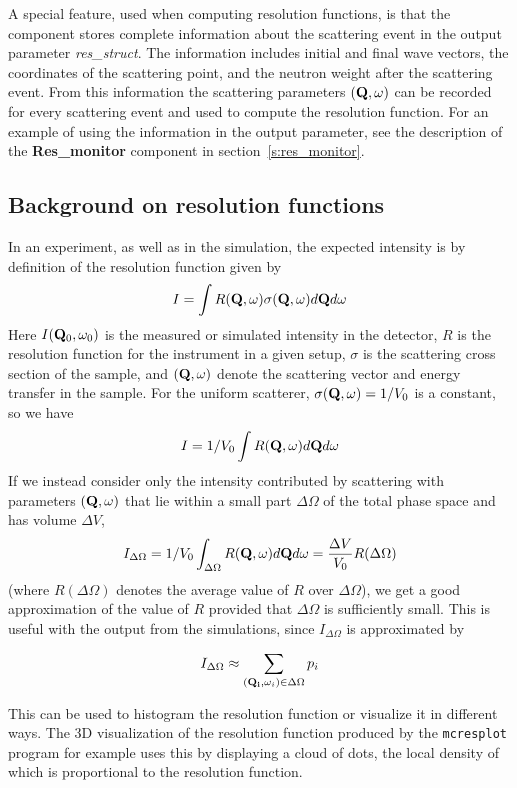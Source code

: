 A special feature, used when computing resolution functions, is that the
component stores complete information about the scattering event in the
output parameter \textit{res\_struct}. The information includes initial
and final wave vectors, the coordinates of the scattering point, and the
neutron weight after the scattering event. From this information the
scattering parameters $({\bf Q}, \omega)$ can be recorded
for every scattering event and used to compute the resolution function.
For an example of using the
information in the output parameter, see the description of the
\textbf{Res\_monitor} component in section~\ref{s:res_monitor}.

\subsection{Background on resolution functions}

In an experiment, as well as in the simulation, the expected intensity
is by definition of the resolution function given by
%
$$
  I = \int R({\bf Q}, \omega) \sigma({\bf Q}, \omega) d{\bf Q}d\omega
$$
%
Here $I({\bf Q}_0, \omega_0)$ is the measured or simulated intensity in
the detector, $R$ is the resolution function for the instrument in a
given setup, $\sigma$ is the scattering cross section of the sample, and
$({\bf Q}, \omega)$ denote the scattering vector and energy transfer in
the sample. For the uniform scatterer, $\sigma({\bf Q}, \omega) = 1/V_0$
is a constant, so we have
%
$$
  I = 1/V_0 \int R({\bf Q}, \omega) d{\bf Q}d\omega
$$
%
If we instead consider only the intensity contributed by scattering with
parameters $({\bf Q}, \omega)$ that lie within a small part $\Delta\Omega$ of
the total phase space and has volume $\Delta V$,
%
$$
  I_{\Delta\Omega} = 1/V_0 \int_{\Delta\Omega} R({\bf Q}, \omega) d{\bf Q}d\omega
  = \frac{\Delta V}{V_0} R(\Delta\Omega)
$$
%
(where $R(\Delta\Omega)$ denotes the average value of $R$ over
$\Delta\Omega$), we get a good approximation of the value of $R$
provided that $\Delta\Omega$ is sufficiently small. This is useful with
the output from the simulations, since $I_{\Delta\Omega}$ is
approximated by

$$ I_{\Delta\Omega} \approx \sum_{({\bf Q_i},\omega_i) \in \Delta\Omega} p_i $$


This can be used to
histogram the resolution function or visualize it in different ways. The
3D visualization of the resolution function produced by the
\verb+mcresplot+ program for example uses this by displaying a cloud of
dots, the local density of which is proportional to the resolution
function.


